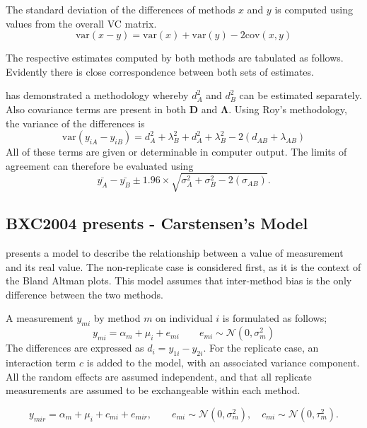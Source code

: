 \documentclass[12pt, a4paper]{report}
\theoremstyle{plain}
\theoremstyle{definition}
\theoremstyle{remark}
\begin{document}
	The standard deviation of the differences of methods $x$ and $y$ is computed using values from the overall VC matrix.
	\[
	\mbox{var}(x - y ) = \mbox{var} ( x )  + \mbox{var} ( y ) - 2\mbox{cov} ( x ,y )
	\]
	
	
	The respective estimates computed by both methods are tabulated as follows. Evidently there is close correspondence between both sets of estimates.
	
	
	

	\citet{roy} has demonstrated a methodology whereby $d^2_{A}$ and $d^2_{B}$ can be estimated separately. Also covariance terms are present in both $\boldsymbol{D}$ and $\boldsymbol{\Lambda}$. Using Roy's methodology, the variance of the differences is
	\begin{equation}
		\mbox{var} (y_{iA}-y_{iB})= d^2_{A} + \lambda^2_{B} + d^2_{A} + \lambda^2_{B} - 2(d_{AB} + \lambda_{AB})
	\end{equation}
	All of these terms are given or determinable in computer output.
	The limits of agreement can therefore be evaluated using
	\begin{equation}
		\bar{y_{A}}-\bar{y_{B}} \pm 1.96 \times \sqrt{ \sigma^2_{A} + \sigma^2_{B}  - 2(\sigma_{AB})}.
	\end{equation}
\subsection{BXC2004 presents - Carstensen's Model}

\citet{BXC2004} presents a model to describe the relationship between a value of measurement and its
real value. The non-replicate case is considered first, as it is the context of the Bland Altman plots. This model assumes that inter-method bias is the only difference between the two methods.

A measurement $y_{mi}$ by method $m$ on individual $i$ is formulated as follows;
\begin{equation}
y_{mi}  = \alpha_{m} + \mu_{i} + e_{mi} \qquad  e_{mi} \sim
\mathcal{N}(0,\sigma^{2}_{m})
\end{equation}
The differences are expressed as $d_{i} = y_{1i} - y_{2i}$. For the replicate case, an interaction term $c$ is added to the model, with an associated variance component. All the random effects are assumed independent, and that all replicate measurements are assumed to be exchangeable within each method.

\begin{equation}
y_{mir}  = \alpha_{m} + \mu_{i} + c_{mi} + e_{mir}, \qquad  e_{mi}
\sim \mathcal{N}(0,\sigma^{2}_{m}), \quad c_{mi} \sim \mathcal{N}(0,\tau^{2}_{m}).
\end{equation}
\end{document}
